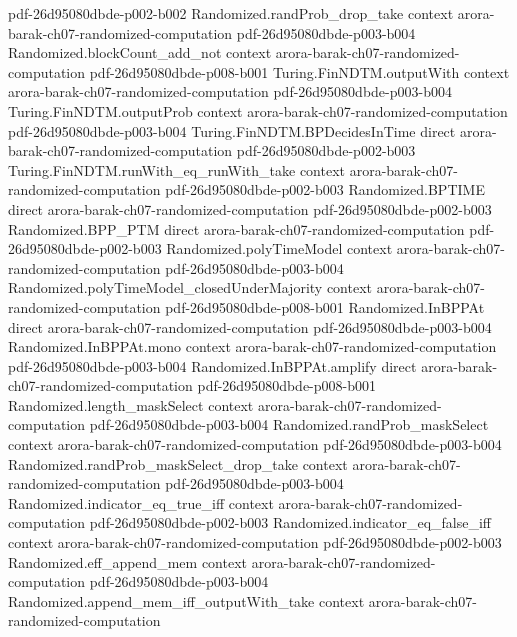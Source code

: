 \begin{theorem}
  {pdf-26d95080dbde-p002-b002}
\proofstep
  {Randomized.randProb_drop_take}
  {context}
  {arora-barak-ch07-randomized-computation}
  {pdf-26d95080dbde-p003-b004}
\proofstep
  {Randomized.blockCount_add_not}
  {context}
  {arora-barak-ch07-randomized-computation}
  {pdf-26d95080dbde-p008-b001}
\proofstep
  {Turing.FinNDTM.outputWith}
  {context}
  {arora-barak-ch07-randomized-computation}
  {pdf-26d95080dbde-p003-b004}
\proofstep
  {Turing.FinNDTM.outputProb}
  {context}
  {arora-barak-ch07-randomized-computation}
  {pdf-26d95080dbde-p003-b004}
\proofstep
  {Turing.FinNDTM.BPDecidesInTime}
  {direct}
  {arora-barak-ch07-randomized-computation}
  {pdf-26d95080dbde-p002-b003}
\proofstep
  {Turing.FinNDTM.runWith_eq_runWith_take}
  {context}
  {arora-barak-ch07-randomized-computation}
  {pdf-26d95080dbde-p002-b003}
\proofstep
  {Randomized.BPTIME}
  {direct}
  {arora-barak-ch07-randomized-computation}
  {pdf-26d95080dbde-p002-b003}
\proofstep
  {Randomized.BPP_PTM}
  {direct}
  {arora-barak-ch07-randomized-computation}
  {pdf-26d95080dbde-p002-b003}
\proofstep
  {Randomized.polyTimeModel}
  {context}
  {arora-barak-ch07-randomized-computation}
  {pdf-26d95080dbde-p003-b004}
\proofstep
  {Randomized.polyTimeModel_closedUnderMajority}
  {context}
  {arora-barak-ch07-randomized-computation}
  {pdf-26d95080dbde-p008-b001}
\proofstep
  {Randomized.InBPPAt}
  {direct}
  {arora-barak-ch07-randomized-computation}
  {pdf-26d95080dbde-p003-b004}
\proofstep
  {Randomized.InBPPAt.mono}
  {context}
  {arora-barak-ch07-randomized-computation}
  {pdf-26d95080dbde-p003-b004}
\proofstep
  {Randomized.InBPPAt.amplify}
  {direct}
  {arora-barak-ch07-randomized-computation}
  {pdf-26d95080dbde-p008-b001}
\proofstep
  {Randomized.length_maskSelect}
  {context}
  {arora-barak-ch07-randomized-computation}
  {pdf-26d95080dbde-p003-b004}
\proofstep
  {Randomized.randProb_maskSelect}
  {context}
  {arora-barak-ch07-randomized-computation}
  {pdf-26d95080dbde-p003-b004}
\proofstep
  {Randomized.randProb_maskSelect_drop_take}
  {context}
  {arora-barak-ch07-randomized-computation}
  {pdf-26d95080dbde-p003-b004}
\proofstep
  {Randomized.indicator_eq_true_iff}
  {context}
  {arora-barak-ch07-randomized-computation}
  {pdf-26d95080dbde-p002-b003}
\proofstep
  {Randomized.indicator_eq_false_iff}
  {context}
  {arora-barak-ch07-randomized-computation}
  {pdf-26d95080dbde-p002-b003}
\proofstep
  {Randomized.eff_append_mem}
  {context}
  {arora-barak-ch07-randomized-computation}
  {pdf-26d95080dbde-p003-b004}
\proofstep
  {Randomized.append_mem_iff_outputWith_take}
  {context}
  {arora-barak-ch07-randomized-computation}

\end{theorem}
